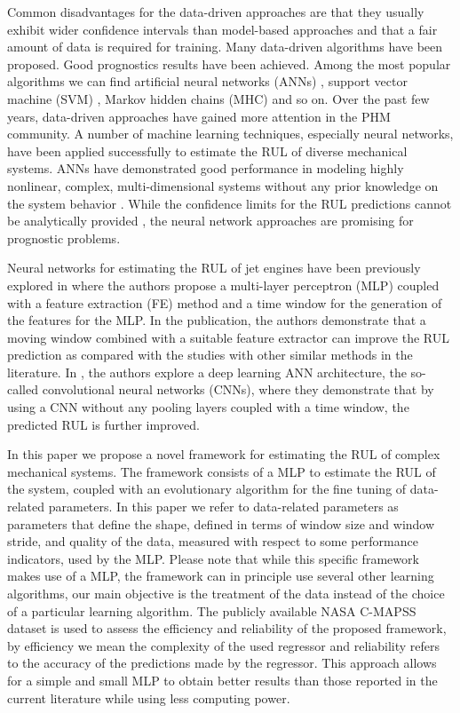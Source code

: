\documentclass[preprint,12pt]{elsarticle}%
\begin{document}
Common disadvantages for the data-driven approaches are that they usually
exhibit wider confidence intervals than model-based approaches and that a fair
amount of data is required for training. Many data-driven algorithms have been
proposed. Good prognostics results have been achieved. Among the most popular
algorithms we can find artificial neural networks (ANNs) \cite{Gebraeel2005},
support vector machine (SVM) \cite{Benkedjouh2013}, Markov hidden chains (MHC)
\cite{Dong2007} and so on. Over the past few years, data-driven approaches
have gained more attention in the PHM community. A number of machine learning
techniques, especially neural networks, have been applied successfully to
estimate the RUL of diverse mechanical systems. ANNs have demonstrated good
performance in modeling highly nonlinear, complex, multi-dimensional systems
without any prior knowledge on the system behavior \cite{Li2018}. While the
confidence limits for the RUL predictions cannot be analytically provided
\cite{Sikorska2011}, the neural network approaches are promising for
prognostic problems.

Neural networks for estimating the RUL of jet engines have been previously
explored in \cite{Lim2016} where the authors propose a multi-layer perceptron
(MLP) coupled with a feature extraction (FE) method and a time window for the
generation of the features for the MLP. In the publication, the authors
demonstrate that a moving window combined with a suitable feature extractor
can improve the RUL prediction as compared with the studies with other similar
methods in the literature. In \cite{Li2018}, the authors explore a deep
learning ANN architecture, the so-called convolutional neural networks (CNNs),
where they demonstrate that by using a CNN without any pooling layers coupled
with a time window, the predicted RUL is further improved.

In this paper we propose a novel framework for estimating the RUL of complex
mechanical systems. The framework consists of a MLP to estimate the RUL of the
system, coupled with an evolutionary algorithm for the fine tuning of
data-related parameters. In this paper we refer to data-related parameters as parameters that define the shape, defined in terms of window size and window stride, and quality of the data, measured with respect to some performance indicators, used by the MLP. Please note that while this specific framework makes use of a MLP, 
the framework can in principle use several other learning algorithms, our main objective is the 
treatment of the data instead of the choice of a particular learning algorithm.
The publicly available NASA C-MAPSS dataset
\cite{Saxena2008a} is used to assess the efficiency and reliability of the
proposed framework, by efficiency we mean the complexity of the used regressor and reliability refers to the accuracy of the predictions made by the regressor. This approach allows for a simple and small MLP to obtain
better results than those reported in the current literature while using less
computing power.
\end{document}
